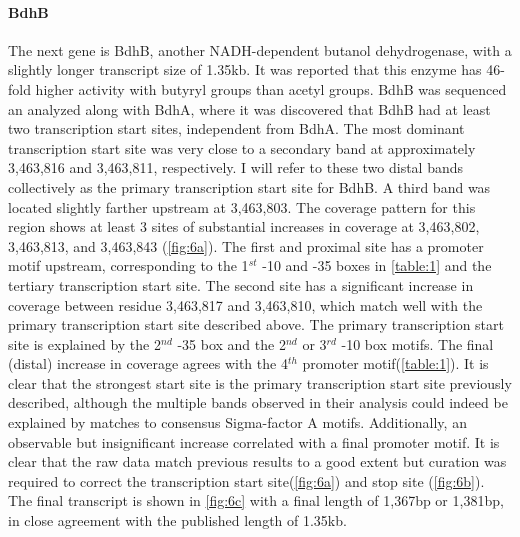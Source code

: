 \paragraph{BdhB}
The next gene is BdhB, another NADH-dependent butanol dehydrogenase, with a slightly longer transcript size of 1.35kb. It was reported that this enzyme has 46-fold higher activity with butyryl groups than acetyl groups\cite{70,72}. BdhB was sequenced an analyzed along with BdhA, where it was discovered that BdhB had at least two transcription start sites, independent from BdhA. The most dominant transcription start site was very close to a secondary band at approximately 3,463,816 and 3,463,811, respectively\cite{72}. I will refer to these two distal bands collectively as the primary transcription start site for BdhB. A third band was located slightly farther upstream at 3,463,803\cite{72}. The coverage pattern for this region shows at least 3 sites of substantial increases in coverage at 3,463,802, 3,463,813, and 3,463,843 (\ref{fig:6a}). The first and proximal site has a promoter motif upstream, corresponding to the 1$^{st}$ -10 and -35 boxes in \ref{table:1} and the tertiary transcription start site\cite{72}. The second site has a significant increase in coverage between residue 3,463,817 and 3,463,810, which match well with the primary transcription start site described above\cite{72}. The primary transcription start site is explained by the 2$^{nd}$  -35 box and the 2$^{nd}$ or 3$^{rd}$ -10 box motifs\cite{72}. The final (distal) increase in coverage agrees with the 4$^{th}$ promoter motif(\ref{table:1}). It is clear that the strongest start site is the primary transcription start site previously described\cite{72}, although the multiple bands observed in their analysis could indeed be explained by matches to consensus Sigma-factor A motifs. Additionally, an observable but insignificant increase correlated with a final promoter motif. It is clear that the raw data match previous results to a good extent but curation was required to correct the transcription start site(\ref{fig:6a}) and stop site (\ref{fig:6b}). The final transcript is shown in \ref{fig:6c} with a final length of 1,367bp or 1,381bp, in close agreement with the published length of 1.35kb.

